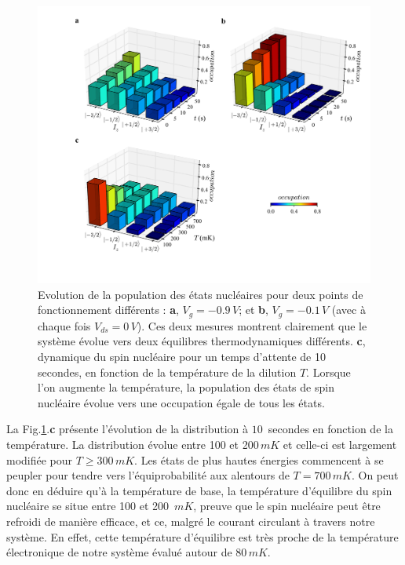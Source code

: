 \begin{figure}[h!]
\includegraphics[scale=0.45]{Resultats/SpinTemp/SpinTemp.pdf} 
\caption{Evolution de la population des états nucléaires pour deux points de fonctionnement différents : \textbf{a}, $V_g = -0.9\,V$; et \textbf{b}, $V_g = -0.1\,V$ (avec à chaque fois $V_{ds} = 0\,V$). Ces deux mesures montrent clairement que le système évolue vers deux équilibres thermodynamiques différents. \textbf{c}, dynamique du spin nucléaire pour un temps d'attente de 10 secondes, en fonction de la température de la dilution $T$. Lorsque l'on augmente la température, la population des états de spin nucléaire évolue vers une occupation égale de tous les états.}
\label{dynamique_spin}
\end{figure}


La Fig.\ref{dynamique_spin}.\textbf{c} présente l'évolution de la distribution à $10\,$ secondes en fonction de la température. La distribution évolue entre 100 et 200$\,mK$ et celle-ci est largement modifiée pour $T\geq 300\,mK$. Les états de plus hautes énergies commencent à se peupler pour tendre vers l'équiprobabilité aux alentours de $T=700\,mK$. On peut donc en déduire qu'à la température de base, la température d'équilibre du spin nucléaire se situe entre 100 et 200 $\,mK$, preuve que le spin nucléaire peut être refroidi de manière efficace, et ce, malgré le courant circulant à travers notre système. En effet, cette température d'équilibre est très proche de la température électronique de notre système évalué autour de $80\,mK$.
